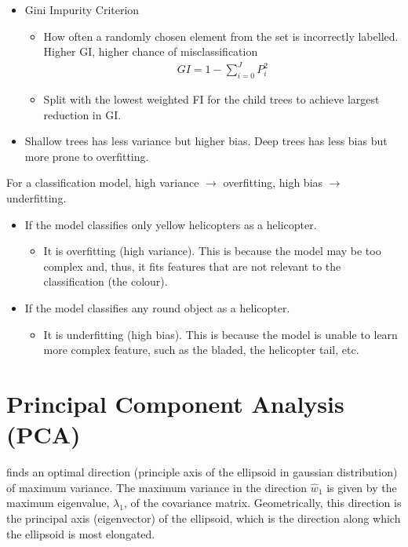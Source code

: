\documentclass[a4paper,10pt]{article}
\begin{document}
\begin{itemize}
\begin{itemize}
        \end{itemize}
        \vspace*{-0.4cm}
    \item Gini Impurity Criterion
        \begin{itemize}
            \item How often a randomly chosen element from the set is incorrectly labelled. Higher GI, higher chance of misclassification
            \begin{gather*}
                GI = 1-\sum_{i=0}^{J}P_i^2
            \end{gather*}
            \vspace*{-0.4cm}
            \item Split with the lowest weighted FI for the child trees to achieve largest reduction in GI.
        \end{itemize}
    \item Shallow trees has less variance but higher bias. Deep trees has less bias but more prone to overfitting. 
\end{itemize}

\par
For a classification model, high variance $\rightarrow$ overfitting, high bias $\rightarrow$ underfitting. 
\begin{itemize}
    \item If the model classifies only yellow helicopters as a helicopter.
        \begin{itemize}
            \item It is overfitting (high variance). This is because the model may be too complex and, thus, it fits features that are not relevant to the classification (the colour).
        \end{itemize}
    \item If the model classifies any round object as a helicopter.
        \begin{itemize}
            \item It is underfitting (high bias). This is because the model is unable to learn more complex feature, such as the bladed, the helicopter tail, etc.
        \end{itemize}
\end{itemize}


\section{Principal Component Analysis (PCA)}
finds an optimal direction (principle axis of the ellipsoid in gaussian distribution) of maximum variance. The maximum variance in the direction $\hat{w}_1$ is given by the maximum eigenvalue, $\lambda_1$, of the covariance matrix. Geometrically, this direction is the principal axis (eigenvector) of the ellipsoid, which is the direction along which the ellipsoid is most elongated.\par 
\end{document}
